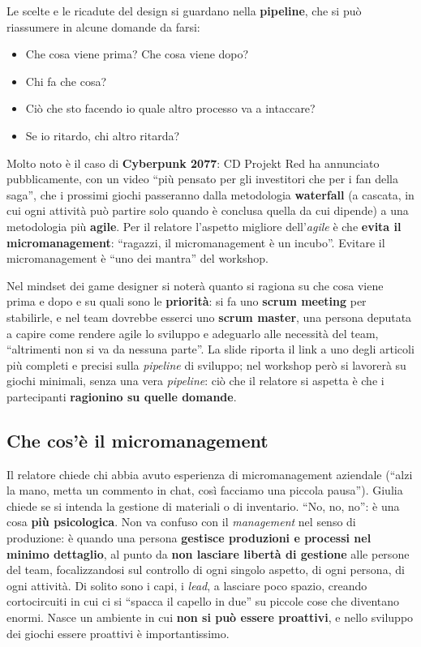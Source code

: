 Le scelte e le ricadute del design si guardano nella \textbf{pipeline}, che si
può riassumere in alcune domande da farsi:
\begin{itemize}
  \item Che cosa viene prima? Che cosa viene dopo?
  \item Chi fa che cosa?
  \item Ciò che sto facendo io quale altro processo va a intaccare?
  \item Se io ritardo, chi altro ritarda?
\end{itemize}
Molto noto è il caso di \textbf{Cyberpunk 2077}: CD Projekt Red ha annunciato
pubblicamente, con un video ``più pensato per gli investitori che per i fan
della saga'', che i prossimi giochi passeranno dalla metodologia
\textbf{waterfall} (a cascata, in cui ogni attività può partire solo quando è
conclusa quella da cui dipende) a una metodologia più \textbf{agile}. Per il
relatore l'aspetto migliore dell'\emph{agile} è che \textbf{evita il
micromanagement}: ``ragazzi, il micromanagement è un incubo''. Evitare il
micromanagement è ``uno dei mantra'' del workshop.

Nel mindset dei game designer si noterà quanto si ragiona su che cosa viene
prima e dopo e su quali sono le \textbf{priorità}: si fa uno \textbf{scrum
meeting} per stabilirle, e nel team dovrebbe esserci uno \textbf{scrum master},
una persona deputata a capire come rendere agile lo sviluppo e adeguarlo alle
necessità del team, ``altrimenti non si va da nessuna parte''. La slide riporta
il link a uno degli articoli più completi e precisi sulla \emph{pipeline} di
sviluppo; nel workshop però si lavorerà su giochi minimali, senza una vera
\emph{pipeline}: ciò che il relatore si aspetta è che i partecipanti
\textbf{ragionino su quelle domande}.

\subsection{Che cos'è il micromanagement}

Il relatore chiede chi abbia avuto esperienza di micromanagement aziendale
(``alzi la mano, metta un commento in chat, così facciamo una piccola pausa'').
Giulia chiede se si intenda la gestione di materiali o di inventario. ``No, no,
no'': è una cosa \textbf{più psicologica}. Non va confuso con il
\emph{management} nel senso di produzione: è quando una persona \textbf{gestisce
produzioni e processi nel minimo dettaglio}, al punto da \textbf{non lasciare
libertà di gestione} alle persone del team, focalizzandosi sul controllo di ogni
singolo aspetto, di ogni persona, di ogni attività. Di solito sono i capi, i
\emph{lead}, a lasciare poco spazio, creando cortocircuiti in cui ci si
``spacca il capello in due'' su piccole cose che diventano enormi. Nasce un
ambiente in cui \textbf{non si può essere proattivi}, e nello sviluppo dei giochi
essere proattivi è importantissimo.

